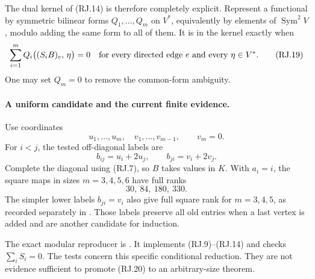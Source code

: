 The dual kernel of (RJ.14) is therefore completely
explicit. Represent a functional by symmetric bilinear forms
\(Q_1,\ldots,Q_m\) on \(V^*\), equivalently by elements
of \(\operatorname{Sym}^2V\), modulo adding the same
form to all of them. It is in the kernel exactly when
\[
                \sum_{i=1}^m
                    Q_i\bigl((S_iB)_e,\,\eta\bigr)=0
           \quad\hbox{for every directed edge }e
                         \hbox{ and every }\eta\in V^*.
                                                               \tag{RJ.19}
\]
One may set \(Q_m=0\) to remove the common-form ambiguity.

\paragraph{A uniform candidate and the current finite evidence.}
Use coordinates
\[
             u_1,\ldots,u_m,\quad v_1,\ldots,v_{m-1},
                         \qquad v_m=0.
\]
For \(i<j\), the tested off-diagonal labels are
\[
                   b_{ij}=u_i+2u_j,\qquad
                   b_{ji}=v_i+2v_j .
                                                               \tag{RJ.20}
\]
Complete the diagonal using (RJ.7), so \(B\) takes
values in \(K\). With \(a_i=i\), the square maps
in sizes \(m=3,4,5,6\) have full ranks
\[
                            30,\ 84,\ 180,\ 330.
 \]
The simpler lower labels \(b_{ji}=v_i\) also give full
square rank for \(m=3,4,5\), as recorded separately in
.
Those labels preserve all old entries when a last
vertex is added and are another candidate for induction.

The exact modular reproducer is
.
It implements (RJ.9)--(RJ.14) and checks
\(\sum_iS_i=0\).
The tests concern this specific conditional reduction.
They are not evidence sufficient to promote (RJ.20)
to an arbitrary-size theorem.

